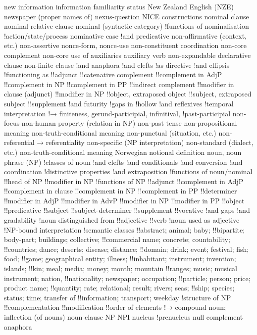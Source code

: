 new information information familiarity status
New Zealand English (NZE)
newspaper (proper names of)
nexus-question
NICE constructions
nominal clause
nominal relative clause
nominal (syntactic category)
!functions of
nominalisation
!action/state/process
nominative case
!and predicative
non-affirmative (context, etc.)
non-assertive
nonce-form, nonce-use
non-constituent coordination
non-core complement
non-core use of auxiliaries auxiliary verb
non-expandable declarative clause
non-finite clause
!and anaphora
!and clefts
!as directive
!and ellipsis
!functioning as
!!adjunct
!!catenative complement
!!complement in AdjP
!!complement in NP
!!complement in PP
!!indirect complement
!!modifier in clause (adjunct)
!!modifier in NP
!!object, extraposed object
!!subject, extraposed subject
!!supplement
!and futurity
!gaps in
!hollow
!and reflexives
!temporal interpretation
!→ finiteness, gerund-participial, infinitival,
!past-participial
non-focus
non-human property (relation in NP)
non-past tense
non-propositional meaning
non-truth-conditional meaning
non-punctual (situation, etc.)
non-referential → referentiality
non-specific (NP interpretation)
non-standard (dialect, etc.)
non-truth-conditional meaning
Norwegian
notional definition
noun, noun phrase (NP)
!classes of noun
!and clefts
!and conditionals
!and conversion
!and coordination
!distinctive properties
!and extraposition
!functions of noun/nominal
!!head of NP
!!modifier in NP
!functions of NP
!!adjunct
!!complement in AdjP
!!complement in clause
!!complement in NP
!!complement in PP
!!determiner
!!modifier in AdjP
!!modifier in AdvP
!!modifier in NP
!!modifier in PP
!!object
!!predicative
!!subject
!!subject-determiner
!!supplement
!!vocative
!and gaps
!and gradability
!noun distinguished from
!!adjective
!!verb
!noun used as adjective
!NP-bound interpretation
!semantic classes
!!abstract; animal; baby;
!!bipartite; body-part; buildings; collective;
!!commercial name; concrete; countability;
!!countries; dance; deserts; disease; distance;
!!domain; drink; event; festival; fish; food;
!!game; geographical entity; illness;
!!inhabitant; instrument; invention; islands;
!!kin; meal; media; money; month; mountain
!!ranges; music; musical instrument; nation,
!!nationality; newspaper; occupation;
!!particle; person; price; product name;
!!quantity; rate; relational; result; rivers; seas;
!!ship; species; status; time; transfer of
!!information; transport; weekday
!structure of NP
!!complementation
!!modification
!!order of elements
!→ compound noun; inflection (of nouns)
noun clause
NP
NPI
nucleus
!prenucleus
null complement anaphora
